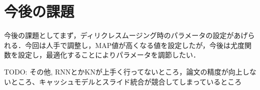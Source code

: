 \section{今後の課題}
今後の課題としてまず，ディリクレスムージング時のパラメータの設定があげられる．今回は人手で調整し，MAP値が高くなる値を設定したが，今後は尤度関数を設定し，最適化することによりパラメータを調節したい．

TODO: その他, RNNとかKNが上手く行ってないところ，論文の精度が向上しないところ、キャッシュモデルとスライド統合が競合してしまっているところ



